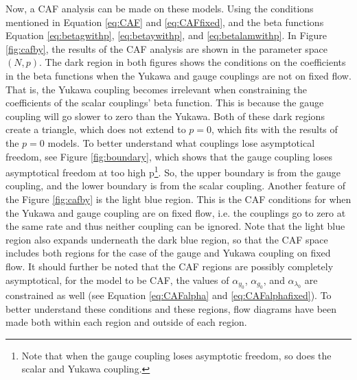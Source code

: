 Now, a CAF analysis can be made on these models. Using the conditions mentioned in Equation \ref{eq:CAF} and \ref{eq:CAFfixed}, and the beta functions Equation \ref{eq:betagwithp}, \ref{eq:betaywithp}, and \ref{eq:betalamwithp}. In Figure \ref{fig:cafby}, the results of the CAF analysis are shown in the parameter space $(N,p)$. The dark region in both figures shows the conditions on the coefficients in the beta functions when the Yukawa and gauge couplings are not on fixed flow. That is, the Yukawa coupling becomes irrelevant when constraining the coefficients of the scalar couplings' beta function. This is because the gauge coupling will go slower to zero than the Yukawa. Both of these dark regions create a triangle, which does not extend to $p=0$, which fits with the results of the $p=0$ models. To better understand what couplings lose asymptotical freedom, see Figure \ref{fig:boundary}, which shows that the gauge coupling loses asymptotical freedom at too high p\footnote{Note that when the gauge coupling loses asymptotic freedom, so does the scalar and Yukawa coupling.}. So, the upper boundary is from the gauge coupling, and the lower boundary is from the scalar coupling. Another feature of the Figure \ref{fig:cafby} is the light blue region. This is the CAF conditions for when the Yukawa and gauge coupling are on fixed flow, i.e. the couplings go to zero at the same rate and thus neither coupling can be ignored. Note that the light blue region also expands underneath the dark blue region, so that the CAF space includes both regions for the case of the gauge and Yukawa coupling on fixed flow. It should further be noted that the CAF regions are possibly completely asymptotical, for the model to be CAF, the values of $\alpha_{y_0}$, $\alpha_{g_0}$, and $\alpha_{\lambda_0}$ are constrained as well (see Equation \ref{eq:CAFalpha} and \ref{eq:CAFalphafixed}). To better understand these conditions and these regions, flow diagrams have been made both within each region and outside of each region. 




